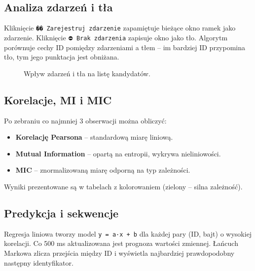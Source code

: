 \documentclass[a4paper,12pt,polish]{article}
\begin{document}
\subsection{Analiza zdarzeń i tła}
Kliknięcie \texttt{�� Zarejestruj zdarzenie} zapamiętuje bieżące okno ramek jako zdarzenie. Kliknięcie \texttt{⛔ Brak zdarzenia} zapisuje okno jako tło. Algorytm porównuje cechy ID pomiędzy zdarzeniami a tłem – im bardziej ID przypomina tło, tym jego punktacja jest obniżana.

\begin{figure}[H]
\centering
{}
\caption{Wpływ zdarzeń i tła na listę kandydatów.}
\label{fig:contrast}
\end{figure}

\subsection{Korelacje, MI i MIC}
Po zebraniu co najmniej 3 obserwacji można obliczyć:
\begin{itemize}[noitemsep]
  \item \textbf{Korelację Pearsona} – standardową miarę liniową.
  \item \textbf{Mutual Information} – opartą na entropii, wykrywa nieliniowości.
  \item \textbf{MIC} – znormalizowaną miarę odporną na typ zależności.
\end{itemize}
Wyniki prezentowane są w tabelach z kolorowaniem (zielony – silna zależność).

\subsection{Predykcja i sekwencje}
Regresja liniowa tworzy model \texttt{y = a·x + b} dla każdej pary (ID, bajt) o wysokiej korelacji. Co 500 ms aktualizowana jest prognoza wartości zmiennej. Łańcuch Markowa zlicza przejścia między ID i wyświetla najbardziej prawdopodobny następny identyfikator.
\end{document}
